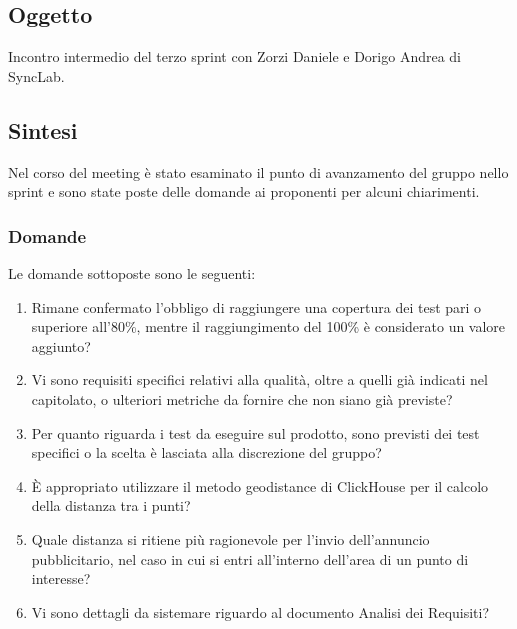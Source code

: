 \documentclass[10pt]{article}
\begin{document}
\subsection{Oggetto}
Incontro intermedio del terzo sprint con Zorzi Daniele e Dorigo Andrea di SyncLab.

\subsection{Sintesi}
Nel corso del meeting è stato esaminato il punto di avanzamento del gruppo nello sprint e sono state poste delle domande ai proponenti per alcuni chiarimenti.

\subsubsection{Domande}
Le domande sottoposte sono le seguenti:
\begin{enumerate}
    \item Rimane confermato l'obbligo di raggiungere una copertura dei test pari o superiore all'80\%, mentre il raggiungimento del 100\% è considerato un valore aggiunto?
    \item Vi sono requisiti specifici relativi alla qualità, oltre a quelli già indicati nel capitolato, o ulteriori metriche da fornire che non siano già previste?
    \item Per quanto riguarda i test da eseguire sul prodotto, sono previsti dei test specifici o la scelta è lasciata alla discrezione del gruppo?
    \item È appropriato utilizzare il metodo geodistance di ClickHouse per il calcolo della distanza tra i punti?
    \item Quale distanza si ritiene più ragionevole per l'invio dell'annuncio pubblicitario, nel caso in cui si entri all'interno dell'area di un punto di interesse?
    \item Vi sono dettagli da sistemare riguardo al documento Analisi dei Requisiti?
\end{enumerate}
\end{document}

